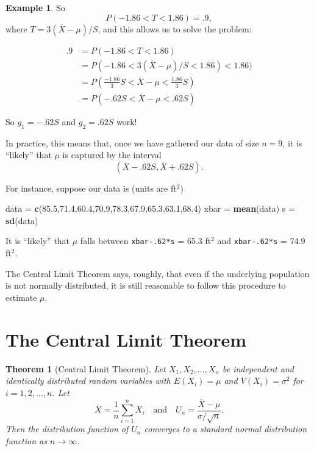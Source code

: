 \documentclass[
]{book}
\newenvironment{Shaded}{\begin{snugshade}}{\end{snugshade}}
\newcommand{\FloatTok}[1]{\textcolor[rgb]{0.00,0.00,0.81}{#1}}
\newcommand{\FunctionTok}[1]{\textcolor[rgb]{0.13,0.29,0.53}{\textbf{#1}}}
\newcommand{\NormalTok}[1]{#1}
\newcommand{\OtherTok}[1]{\textcolor[rgb]{0.56,0.35,0.01}{#1}}
\newtheorem{theorem}{Theorem}[chapter]
\theoremstyle{definition}
\theoremstyle{definition}
\newtheorem{example}{Example}[chapter]
\theoremstyle{definition}
\theoremstyle{definition}
\theoremstyle{remark}
\begin{document}
\begin{example}
So \[P(-1.86 < T < 1.86) = .9,\]
where \(T = 3(\overline{X}-\mu)/S\), and this allows us to solve the problem:

\begin{align*}
.9 &= P(-1.86 < T < 1.86)\\
    &= P(-1.86 < 3(\overline{X}-\mu)/S < 1.86) < 1.86) \\
    &= P(\frac{-1.86}{3}S < \overline{X}-\mu < \frac{1.86}{3}S )\\
    &= P(-.62 S < \overline{X}-\mu < .62 S)
\end{align*}

So \(g_1 = -.62S\) and \(g_2 = .62S\) work!

In practice, this means that, once we have gathered our data of size \(n = 9\), it is ``likely'' that \(\mu\) is captured by the interval \[(\overline{X} - .62S, \overline{X} + .62S).\]

For instance, suppose our data is (units are ft\(^2\))

\begin{Shaded}
\begin{Highlighting}[]
\NormalTok{data }\OtherTok{=} \FunctionTok{c}\NormalTok{(}\FloatTok{85.5}\NormalTok{,}\FloatTok{71.4}\NormalTok{,}\FloatTok{60.4}\NormalTok{,}\FloatTok{70.9}\NormalTok{,}\FloatTok{78.3}\NormalTok{,}\FloatTok{67.9}\NormalTok{,}\FloatTok{65.3}\NormalTok{,}\FloatTok{63.1}\NormalTok{,}\FloatTok{68.4}\NormalTok{)}
\NormalTok{xbar }\OtherTok{=} \FunctionTok{mean}\NormalTok{(data)}
\NormalTok{s }\OtherTok{=} \FunctionTok{sd}\NormalTok{(data)}
\end{Highlighting}
\end{Shaded}

It is ``likely'' that \(\mu\) falls between \texttt{xbar-.62*s} = 65.3 ft\(^2\) and \texttt{xbar-.62*s} = 74.9 ft\(^2\).
\end{example}

The Central Limit Theorem says, roughly, that even if the underlying population is not normally distributed, it is still reasonable to follow this procedure to estimate \(\mu\).

\section{The Central Limit Theorem}\label{the-central-limit-theorem}

\begin{theorem}[Central Limit Theorem]
\protect\hypertarget{thm:clt}{}\label{thm:clt}Let \(X_1, X_2, \ldots, X_n\) be independent and identically distributed random variables with \(E(X_i) = \mu\) and \(V(X_i) = \sigma^2\) for \(i = 1,2,\ldots,n\). Let \[\overline{X} = \frac{1}{n}\sum_{i=1}^n X_i ~~~ \text{ and } ~~~ U_n = \frac{\overline{X}-\mu}{\sigma/\sqrt{n}}.\]
Then the distribution function of \(U_n\) converges to a standard normal distribution function as \(n \to \infty\).
\end{theorem}
\end{document}
